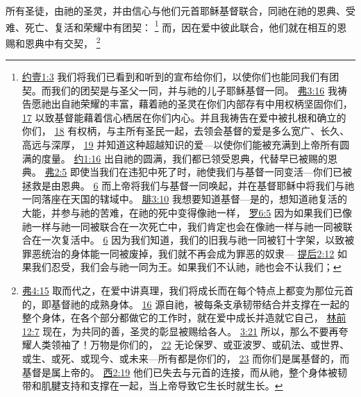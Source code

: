 \documentclass[12pt, a4paper, oneside]{ctexart}
\newcounter{parnum}[section]
\newcommand{\N}{%
   \noindent\refstepcounter{parnum}%
    \makebox[\parindent][l]{\textbf{\arabic{parnum}.}}}
\begin{document}
\N 所有圣徒，由祂的圣灵，并由信心与他们元首耶稣基督联合，同祂在祂的恩典、受难、死亡、复活和荣耀中有团契：
	\footnote {
		\href{https://biblehub.com/1_john/1-3.htm}{约壹1:3} 我们将我们已看到和听到的宣布给你们，以使你们也能同我们有团契。而我们的团契是与圣父一同，并与祂的儿子耶稣基督一同。
		\href{https://biblehub.com/ephesians/3-16.htm}{弗3:16} 我祷告愿祂出自祂荣耀的丰富，藉着祂的圣灵在你们内部存有中用权柄坚固你们，
		\href{https://biblehub.com/ephesians/3-17.htm}{17} 以致基督能藉着信心栖居在你们内心。并且我祷告在爱中被扎根和确立的你们，
		\href{https://biblehub.com/ephesians/3-18.htm}{18} 有权柄，与主所有圣民一起，去领会基督的爱是多么宽广、长久、高远与深厚，
		\href{https://biblehub.com/ephesians/3-19.htm}{19} 并知道这种超越知识的爱---以使你们能被充满到上帝所有圆满的度量。
		\href{https://biblehub.com/john/1-16.htm}{约1:16} 出自祂的圆满，我们都已领受恩典，代替早已被赐的恩典。
		\href{https://biblehub.com/ephesians/2-5.htm}{弗2:5} 即使当我们在违犯中死了时，祂使我们与基督一同变活---你们已被拯救是由恩典。
		\href{https://biblehub.com/ephesians/2-6.htm}{6} 而上帝将我们与基督一同唤起，并在基督耶稣中将我们与祂一同落座在天国的辖域中。
		\href{https://biblehub.com/philippians/3-10.htm}{腓3:10} 我想要知道基督---是的，想知道祂复活的大能，并参与祂的苦难，在祂的死中变得像祂一样，
		\href{https://biblehub.com/romans/6-5.htm}{罗6:5} 因为如果我们已像祂一样与祂一同被联合在一次死亡中，我们肯定也会在像祂一样与祂一同被联合在一次复活中。
		\href{https://biblehub.com/romans/6-6.htm}{6} 因为我们知道，我们的旧我与祂一同被钉十字架，以致被罪恶统治的身体能一同被废掉，我们就不再会成为罪恶的奴隶---
		\href{https://biblehub.com/2_timothy/2-12.htm}{提后2:12} 如果我们忍受，我们会与祂一同为王。如果我们不认祂，祂也会不认我们；
	}
	而，因在爱中彼此联合，他们就在相互的恩赐和恩典中有交契，
	\footnote {
		\href{https://biblehub.com/ephesians/4-15.htm}{弗4:15} 取而代之，在爱中讲真理，我们将成长而在每个特点上都变为那位元首的，即基督祂的成熟身体。
		\href{https://biblehub.com/ephesians/4-16.htm}{16} 源自祂，被每条支承韧带结合并支撑在一起的整个身体，在各个部分都做它的工作时，就在爱中成长并造就它自己，
		\href{https://biblehub.com/1_corinthians/12-7.htm}{林前12:7} 现在，为共同的善，圣灵的彰显被赐给各人。
		\href{https://biblehub.com/1_corinthians/3-21.htm}{3:21} 所以，那么不要再夸耀人类领袖了！万物是你们的，
		\href{https://biblehub.com/1_corinthians/3-22.htm}{22} 无论保罗、或亚波罗、或矶法、或世界、或生、或死、或现今、或未来---所有都是你们的，
		\href{https://biblehub.com/1_corinthians/3-23.htm}{23} 而你们是属基督的，而基督是属上帝的。
		\href{https://biblehub.com/colossians/2-19.htm}{西2:19} 他们已失去与元首的连接，而从祂，整个身体被韧带和肌腱支持和支撑在一起，当上帝导致它生长时就生长。
	}
\end{document}
